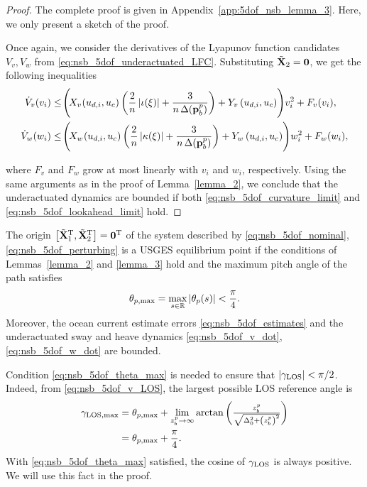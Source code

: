 \begin{proof}
    The complete proof is given in Appendix~\ref{app:5dof_nsb_lemma_3}.
    Here, we only present a sketch of the proof.

    Once again, we consider the derivatives of the Lyapunov function candidates {$V_v, V_w$} from \eqref{eq:nsb_5dof_underactuated_LFC}.
    Substituting $\tilde{\mathbf{X}}_2 = \mathbf{0}$, we get the following inequalities
    \begin{align} 
            \dot{V}_v(v_i) &\leq \!\Bigg(\!X_{v\!}\left(u_{d,i}, u_c\right)\left(\frac{2}{n}\abs{\iota(\xi)} + \frac{3}{n\,\Delta(\mat{p}_b^p)}\right) + Y_v\left(u_{d,i}, u_c\right)\!\Bigg)v_i^2 + F_v(v_i), \\
            \dot{V}_w(w_i) &\leq \!\Bigg(\!X_{w\!}\left(u_{d,i}, u_c\right)\left(\frac{2}{n}\abs{\kappa(\xi)} + \frac{3}{n\,\Delta(\mat{p}_b^p)}\right) + Y_w\left(u_{d,i}, u_c\right)\!\Bigg)w_i^2 + F_w(w_i),
    \end{align}\vspace{-3mm}

    \noindent where $F_v$ and $F_w$ grow at most linearly with $v_i$ and $w_i$, respectively.
    Using the same arguments as in the proof of Lemma~\ref{lemma_2}, we conclude that the underactuated dynamics are bounded if both \eqref{eq:nsb_5dof_curvature_limit} and \eqref{eq:nsb_5dof_lookahead_limit} hold.
\end{proof}

\begin{theorem}
    The origin $\left[\tilde{\mathbf{X}}_1^{\mathrm{T}}, \tilde{\mathbf{X}}_2^{\mathrm{T}}\right] = \mathbf{0}^{\mathrm{T}}$ of the system described by \eqref{eq:nsb_5dof_nominal}, \eqref{eq:nsb_5dof_perturbing} is a USGES equilibrium point if the conditions of Lemmas~\ref{lemma_2} and \ref{lemma_3} hold and the maximum pitch angle of the path satisfies
    \begin{equation}
        \theta_{p, {\rm max}} = \max_{s \in \mathbb{R}} \left|\theta_p(s)\right| < \frac{\pi}{4}.
        \label{eq:nsb_5dof_theta_max}
    \end{equation}
    Moreover, the ocean current estimate errors \eqref{eq:nsb_5dof_estimates} and the underactuated sway and heave dynamics \eqref{eq:nsb_5dof_v_dot}, \eqref{eq:nsb_5dof_w_dot} are bounded.
\end{theorem}

\begin{rmk*}
Condition \eqref{eq:nsb_5dof_theta_max} is needed to ensure that $\left|\gamma_{\rm LOS}\right| < \pi/2$.
Indeed, from \eqref{eq:nsb_5dof_v_LOS}, the largest possible LOS reference angle is
\begin{equation}
    \begin{split}
        \gamma_{\rm LOS, max} &= \theta_{p, {\rm max}} + \lim_{z_b^p \rightarrow \infty} \arctan\left(\scale[1]{\frac{z_b^p}{\sqrt{\Delta_0^2 + \left(z_b^p\right)^2}}}\right) \\
        &= \theta_{p, {\rm max}} + \frac{\pi}{4}.
    \end{split}
\end{equation}
With \eqref{eq:nsb_5dof_theta_max} satisfied, the cosine of $\gamma_{\rm LOS}$ is always positive. We will use this fact in the proof.
\end{rmk*}

